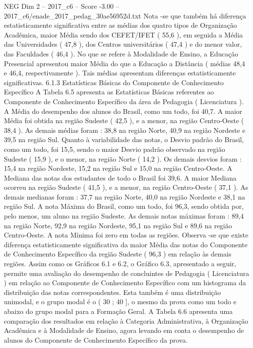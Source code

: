 \begin{textsample}{NEG Dim 2 – 2017\_c6 – Score -3.00 – 2017\_c6/enade\_2017\_pedag\_30ae56952d.txt}
Nota -se que também há diferença estatisticamente significativa entre as médias dos quatro tipos de Organização Acadêmica, maior Média sendo dos CEFET/IFET ( 55,6 ), em seguida a Média das Universidades ( 47,8 ), dos Centros universitários ( 47,4 ) e do menor valor, das Faculdades ( 46,4 ).
No que se refere à Modalidade de Ensino, a Educação Presencial apresentou maior Média do que a Educação a Distância ( médias 48,4 e 46,4, respectivamente ).
Tais médias apresentam diferenças estatisticamente significativas. 6.1.3 Estatísticas Básicas do Componente de Conhecimento Específico A Tabela 6.5 apresenta as Estatísticas Básicas referentes ao Componente de Conhecimento Específico da área de Pedagogia ( Licenciatura ).
A Média do desempenho dos alunos do Brasil, como um todo, foi 40,7.
A maior Média foi obtida na região Sudeste ( 42,5 ), e a menor, na região Centro-Oeste ( 38,4 ).
As demais médias foram : 38,8 na região Norte, 40,9 na região Nordeste e 39,5 na região Sul.
Quanto à variabilidade das notas, o Desvio padrão do Brasil, como um todo, foi 15,5, sendo o maior Desvio padrão observado na região Sudeste ( 15,9 ), e o menor, na região Norte ( 14,2 ).
Os demais desvios foram : 15,4 na região Nordeste, 15,2 na região Sul e 15,0 na região Centro-Oeste.
A Mediana das notas dos estudantes de todo o Brasil foi 39,6.
A maior Mediana ocorreu na região Sudeste ( 41,5 ), e a menor, na região Centro-Oeste ( 37,1 ).
As demais medianas foram : 37,7 na região Norte, 40,0 na região Nordeste e 38,1 na região Sul.
A nota Máxima do Brasil, como um todo, foi 96,3, sendo obtida por, pelo menos, um aluno na região Sudeste.
As demais notas máximas foram : 89,4 na região Norte, 92,9 na região Nordeste, 95,1 na região Sul e 89,6 na região Centro-Oeste.
A nota Mínima foi zero em todas as regiões.
Observa -se que existe diferença estatisticamente significativa da maior Média das notas do Componente de Conhecimento Específico da região Sudeste ( 96,3 ) em relação às demais regiões.
Assim como os Gráficos 6.1 e 6.2, o Gráfico 6.3, apresentado a seguir, permite uma avaliação do desempenho de concluintes de Pedagogia ( Licenciatura ) em relação ao Componente de Conhecimento Específico com um histograma da distribuição das notas correspondentes.
Esta também é uma distribuição unimodal, e o grupo modal é o ( 30 ; 40 ], o mesmo da prova como um todo e abaixo do grupo modal para a Formação Geral.
A Tabela 6.6 apresenta uma comparação dos resultados em relação à Categoria Administrativa, à Organização Acadêmica e à Modalidade de Ensino, agora levando em conta o desempenho de alunos do Componente de Conhecimento Específico da prova.

\end{textsample}
